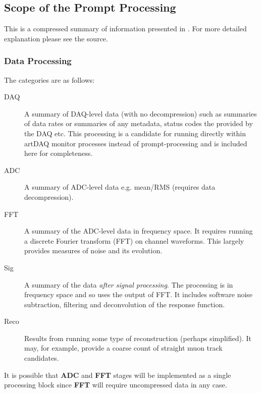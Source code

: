 \documentclass[pdftex,12pt,letter]{article}
\begin{document}
\subsection{Scope of the Prompt Processing}
This is a compressed summary of information presented in \cite{docdb1811}.
For more detailed explanation please see the source.

\subsubsection{Data Processing}
\label{sec:categories}
The categories are as follows:

\begin{description}

\item[DAQ] A summary of DAQ-level data (with no decompression) such as summaries of data
 rates  or summaries of any metadata, status codes the provided by the DAQ etc.
This processing is a candidate for running directly within artDAQ
monitor processes instead of prompt-processing and is included here
for completeness.

\item[ADC] A summary of ADC-level data e.g. mean/RMS (requires data decompression).


\item[FFT] A summary of the ADC-level data in frequency space. It requires running a discrete Fourier
transform (FFT) on channel waveforms. This largely  provides measures of noise and its
evolution.

\item[Sig] A summary of the data \textit{after signal processing}.
The processing is in  frequency space and so uses the output of FFT.  It includes software
noise subtraction, filtering and deconvolution of the response function.

\item[Reco] Results from running some type of reconstruction (perhaps simplified).
It may, for  example, provide a coarse count of straight muon track candidates.

\end{description}


\noindent It is possible that \textbf{ADC} and \textbf{FFT} stages will be implemented as a single processing
block since \textbf{FFT} will require uncompressed data in any case.
\end{document}

